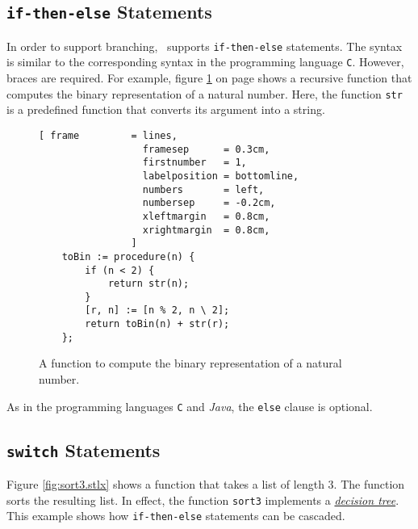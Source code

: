 \subsection{\texttt{if-then-else} Statements}
In order to support branching, \setlx\ supports \texttt{if-then-else} statements.  The syntax is 
similar to the corresponding syntax in the programming language \texttt{C}.  However, braces are
required.  For example, figure \ref{fig:toBin.stlx} on page \pageref{fig:toBin.stlx} shows a
recursive function that computes the binary representation of a
natural number.  Here, the function \texttt{str} is a predefined function that converts its argument
into a string.


\begin{figure}[!ht]
\centering
\begin{Verbatim}[ frame         = lines, 
                  framesep      = 0.3cm, 
                  firstnumber   = 1,
                  labelposition = bottomline,
                  numbers       = left,
                  numbersep     = -0.2cm,
                  xleftmargin   = 0.8cm,
                  xrightmargin  = 0.8cm,
                ]
    toBin := procedure(n) {
        if (n < 2) {
            return str(n);
        }
        [r, n] := [n % 2, n \ 2];
        return toBin(n) + str(r);
    };
\end{Verbatim}
\vspace*{-0.3cm}
\caption{A function to compute the binary representation of a natural number.}
\label{fig:toBin.stlx}
\end{figure}

As in the programming languages \texttt{C} and \textsl{Java}, the
\texttt{else} clause is optional.

\subsection{\texttt{switch} Statements}
Figure \ref{fig:sort3.stlx} shows a function that takes a list of length 3.  The function sorts
the resulting list.  In effect, the function \texttt{sort3} implements a 
\href{http://en.wikipedia.org/wiki/Decision_tree}{\emph{decision tree}}.
This example shows how \texttt{if-then-else} statements can be cascaded.

